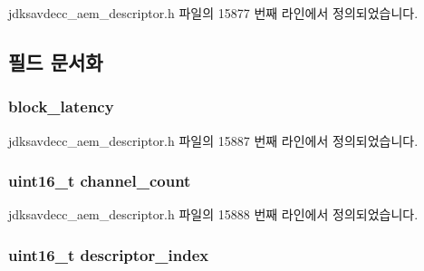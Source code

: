 jdksavdecc\+\_\+aem\+\_\+descriptor.\+h 파일의 15877 번째 라인에서 정의되었습니다.



\subsection{필드 문서화}
\subsubsection[{\texorpdfstring{block\+\_\+latency}{block_latency}}]{ block\+\_\+latency}\hypertarget{structjdksavdecc__descriptor__audio__cluster_ae2e9f0088d5e900b610d1b2818dfc559}{}\label{structjdksavdecc__descriptor__audio__cluster_ae2e9f0088d5e900b610d1b2818dfc559}


jdksavdecc\+\_\+aem\+\_\+descriptor.\+h 파일의 15887 번째 라인에서 정의되었습니다.

\subsubsection[{\texorpdfstring{channel\+\_\+count}{channel_count}}]{\setlength{\rightskip}{0pt plus 5cm}uint16\+\_\+t channel\+\_\+count}\hypertarget{structjdksavdecc__descriptor__audio__cluster_a1a00ba2b3410e15d86581bf7602b30ac}{}\label{structjdksavdecc__descriptor__audio__cluster_a1a00ba2b3410e15d86581bf7602b30ac}


jdksavdecc\+\_\+aem\+\_\+descriptor.\+h 파일의 15888 번째 라인에서 정의되었습니다.

\subsubsection[{\texorpdfstring{descriptor\+\_\+index}{descriptor_index}}]{\setlength{\rightskip}{0pt plus 5cm}uint16\+\_\+t descriptor\+\_\+index}\hypertarget{structjdksavdecc__descriptor__audio__cluster_a042bbc76d835b82d27c1932431ee38d4}{}\label{structjdksavdecc__descriptor__audio__cluster_a042bbc76d835b82d27c1932431ee38d4}


